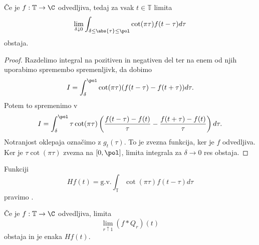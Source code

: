 \begin{trditev}
  Če je $f: \mathbb{T} \to \C$ odvedljiva, tedaj za vsak $t \in \mathbb{T}$
  limita
  \[
	\lim_{\delta \downarrow 0} \int_{\delta \le \abs{\tau} \le \pol} \cot(\pi
	\tau) f(t - \tau) d\tau
  \]
  obstaja.
\end{trditev}

\begin{proof}
  Razdelimo integral na pozitiven in negativen del ter na enem od njih
  uporabimo spremembo spremenljivk, da dobimo
  \[
	I = \int_{\delta}^\pol \cot(\pi \tau) (f(t - \tau) - f(t + \tau)) d\tau.
  \]
  Potem to spremenimo v
  \[
	I = \int_\delta^\pol \tau \cot(\pi \tau) \left( \frac{f(t - \tau) -
		f(t)}{\tau} - \frac{f(t+\tau) - f(t)}{\tau} \right) d\tau.
  \]
  Notranjost oklepaja označimo z $g_t(\tau)$.
  To je zvezna funkcija, ker je $f$ odvedljiva.
  Ker je $\tau \cot(\pi \tau)$ zvezna na $[0,\pol]$, limita integrala za $\delta
  \to 0$ res obstaja.
\end{proof}


Funkciji
\[
  Hf(t) = \text{g.v.} \int_{\mathbb{T}} \cot(\pi \tau) f(t-\tau) d\tau
\]
pravimo .

\begin{trditev}
  Če je $f: \mathbb{T} \to \C$ odvedljiva, limita
  \[
	\lim_{r\uparrow 1} (f * Q_r)(t)
  \]
  obstaja in je enaka $Hf(t)$.
\end{trditev}

